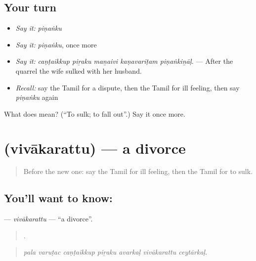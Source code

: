 \subsection*{Your turn}
\begin{itemize}
\raggedright
  \item \emph{Say it:} \emph{piṇaṅku}
  \item \emph{Say it:} \emph{piṇaṅku}, once more
  \item \emph{Say it:} \emph{caṇṭaikkup piṟaku maṉaivi kaṇavariṭam piṇaṅkiṉāḷ.} — After the quarrel the wife sulked with her husband.
  \item \emph{Recall:} say the Tamil for a dispute, then the Tamil for ill feeling, then say \emph{piṇaṅku} again
\end{itemize}

\begin{tcolorbox}[breakable,colback=teal!4,colframe=teal!35!black,title={Before you move on}]
What does  mean? (\textquotedblleft{}To sulk; to fall out\textquotedblright{}.) Say it once more.
\end{tcolorbox}
\section[\texorpdfstring{\ta{விவாகரத்து} (vivākarattu)}{விவாகரத்து (vivākarattu)}]{ (vivākarattu) — a divorce}

\label{lesson:TA-C501-vivakarattu}



\begin{quote}
Before the new one: say the Tamil for ill feeling, then the Tamil for to sulk.
\end{quote}

\subsection*{You'll want to know: }
\textbf{} — \emph{vivākarattu} — \textquotedblleft{}a divorce\textquotedblright{}.

\begin{quote}
      .
\end{quote}

\begin{quote}
\emph{pala varuṭac caṇṭaikkup piṟaku avarkaḷ vivākarattu ceytārkaḷ.}
\end{quote}

